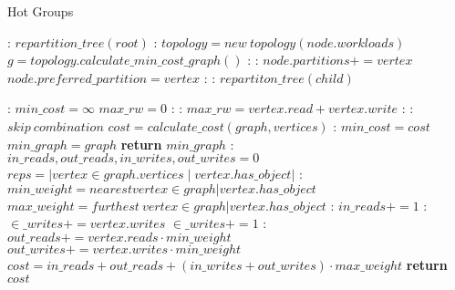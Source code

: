 \documentclass[mscthesis,12pt]{usiinfthesis}
\begin{document}
\begin{algorithm}
	\caption{Hot Groups}\label{alg:hot-groups}
	\begin{algorithmic}[1]
	:
	\State $repartition\_tree(root)$
	\EndFunction
	:
		\State $topology = new\ topology(node.workloads)$
		\State $g = topology.calculate\_min\_cost\_graph()$
		:
		  :
		  \State $node.partitions += vertex$
			  \State $node.preferred\_partition = vertex$
			\EndIf
		  \EndIf
		\EndFor
	  \EndIf
	  :
		:
		  \State $repartiton\_tree(child)$
		  \EndFor
	  \EndIf
	  \EndFunction
	\end{algorithmic}
\end{algorithm}
\begin{algorithm}
	\begin{algorithmic}[1]
	  :
	  \State $min\_cost = \infty$
	  \State $max\_rw = 0$
	  :
		:
		  \State $max\_rw = vertex.read + vertex.write$
		\EndIf
	  \EndFor
	  :
		:
			\State $skip\ combination$
		  \EndIf
		\EndFor
		\State $cost = calculate\_cost(graph, vertices)$
		:
		  \State $min\_cost = cost$
		  \State $min\_graph = graph$
		\EndIf
	  \EndFor
	  \State \textbf{return} $min\_graph$
	  \EndFunction
	  :
		\State $in\_reads, out\_reads, in\_writes, out\_writes = 0$
		\State $reps = |vertex \in graph.vertices \mid vertex.has\_object|$
		:
		\State $min\_weight = nearest vertex \in graph | vertex.has\_object$
		\State $max\_weight = furthest\ vertex \in graph | vertex.has\_object$
		  :
			\State $in\_reads+= 1$
			:
			\State $\in\_writes+= vertex.writes$
			\Else
			\State  $\in\_writes+= 1 $
			\EndIf
		  \Else:
			\State $out\_reads += vertex.reads \cdot min\_weight$
			\State $out\_writes += vertex.writes \cdot min\_weight$
		  \EndIf
		\EndFor
		\State $cost = in\_reads+ out\_reads + (in\_writes+ out\_writes) \cdot max\_weight$
		\State \textbf{return} $cost$
	\EndFunction
	\end{algorithmic}
	\end{algorithm}
  
\end{document}
